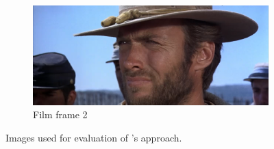 \documentclass{mpaper}
\begin{document}
\begin{figure}
	~
	\begin{subfigure}[b]{0.35\textwidth}
		\includegraphics[width=\textwidth]{images/gbu3}
		\caption{Film frame 2}
		\label{fig:explor-ff2}
	\end{subfigure}
	
	\vspace{0.5em}
	
	\caption{
		Images used for evaluation of \citeauthor{Plane-Graphs-From-Images}'s \cite{Plane-Graphs-From-Images} approach.
	}
\end{figure}
\end{document}
